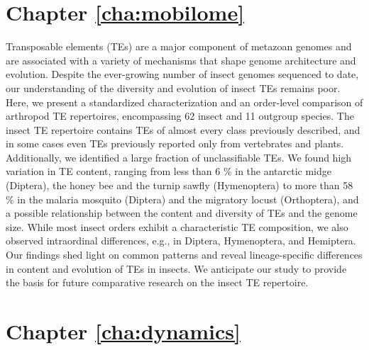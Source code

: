 
\section*{Chapter \ref{cha:mobilome}}

Transposable elements (TEs) are a major component of metazoan genomes
and are associated with a variety of mechanisms that shape genome
architecture and evolution. Despite the ever-growing number of insect
genomes sequenced to date, our understanding of the diversity and
evolution of insect TEs remains poor. Here, we present a standardized
characterization and an order-level comparison of arthropod TE
repertoires, encompassing 62 insect and 11 outgroup species. The insect
TE repertoire contains TEs of almost every class previously described,
and in some cases even TEs previously reported only from vertebrates and
plants. Additionally, we identified a large fraction of unclassifiable
TEs. We found high variation in TE content, ranging from less than 6 \%
in the antarctic midge (Diptera), the honey bee and the turnip sawfly
(Hymenoptera) to more than 58 \% in the malaria mosquito (Diptera) and
the migratory locust (Orthoptera), and a possible relationship between
the content and diversity of TEs and the genome size. While most insect
orders exhibit a characteristic TE composition, we also observed
intraordinal differences, e.g., in Diptera, Hymenoptera, and Hemiptera.
Our findings shed light on common patterns and reveal lineage-specific
differences in content and evolution of TEs in insects. We anticipate
our study to provide the basis for future comparative research on the
insect TE repertoire.%

\section*{Chapter \ref{cha:dynamics}}

